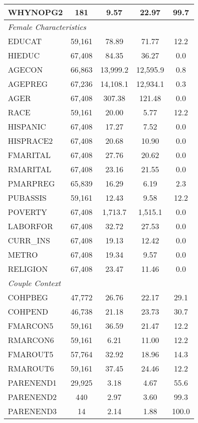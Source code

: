 \begin{longtable}{lcccc}
WHYNOPG2 & 181 & 9.57 & 22.97 & 99.7 \\
\hline
\multicolumn{5}{l}{\textit{Female Characteristics}} \\
EDUCAT & 59,161 & 78.89 & 71.77 & 12.2 \\
HIEDUC & 67,408 & 84.35 & 36.27 & 0.0 \\
AGECON & 66,863 & 13,999.2 & 12,595.9 & 0.8 \\
AGEPREG & 67,236 & 14,108.1 & 12,934.1 & 0.3 \\
AGER & 67,408 & 307.38 & 121.48 & 0.0 \\
RACE & 59,161 & 20.00 & 5.77 & 12.2 \\
HISPANIC & 67,408 & 17.27 & 7.52 & 0.0 \\
HISPRACE2 & 67,408 & 20.68 & 10.90 & 0.0 \\
FMARITAL & 67,408 & 27.76 & 20.62 & 0.0 \\
RMARITAL & 67,408 & 23.16 & 21.55 & 0.0 \\
PMARPREG & 65,839 & 16.29 & 6.19 & 2.3 \\
PUBASSIS & 59,161 & 12.43 & 9.58 & 12.2 \\
POVERTY & 67,408 & 1,713.7 & 1,515.1 & 0.0 \\
LABORFOR & 67,408 & 32.72 & 27.53 & 0.0 \\
CURR_INS & 67,408 & 19.13 & 12.42 & 0.0 \\
METRO & 67,408 & 19.34 & 9.57 & 0.0 \\
RELIGION & 67,408 & 23.47 & 11.46 & 0.0 \\
\hline
\multicolumn{5}{l}{\textit{Couple Context}} \\
COHPBEG & 47,772 & 26.76 & 22.17 & 29.1 \\
COHPEND & 46,738 & 21.18 & 23.73 & 30.7 \\
FMARCON5 & 59,161 & 36.59 & 21.47 & 12.2 \\
RMARCON6 & 59,161 & 6.21 & 11.00 & 12.2 \\
FMAROUT5 & 57,764 & 32.92 & 18.96 & 14.3 \\
RMAROUT6 & 59,161 & 37.45 & 24.46 & 12.2 \\
PARENEND1 & 29,925 & 3.18 & 4.67 & 55.6 \\
PARENEND2 & 440 & 2.97 & 3.60 & 99.3 \\
PARENEND3 & 14 & 2.14 & 1.88 & 100.0 \\
\hline
\end{longtable}